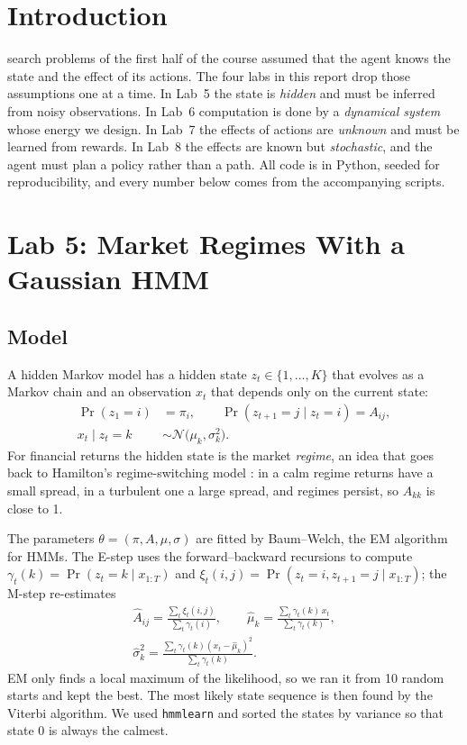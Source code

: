\documentclass[journal]{IEEEtran}
\newcommand{\st}[1]{\texttt{#1}}
\begin{document}
\section{Introduction}
 search problems of the first half of the course assumed that the agent
knows the state and the effect of its actions. The four labs in this report drop those
assumptions one at a time. In Lab~5 the state is \emph{hidden} and must be inferred from noisy
observations. In Lab~6 computation is done by a \emph{dynamical system} whose energy we design.
In Lab~7 the effects of actions are \emph{unknown} and must be learned from rewards. In Lab~8 the
effects are known but \emph{stochastic}, and the agent must plan a policy rather than a path. All
code is in Python, seeded for reproducibility, and every number below comes from the
accompanying scripts.

\section{Lab 5: Market Regimes With a Gaussian HMM}
\subsection{Model}
A hidden Markov model \cite{rabiner1989} has a hidden state $z_t\in\{1,\dots,K\}$ that evolves
as a Markov chain and an observation $x_t$ that depends only on the current state:
\begin{align}
\Pr(z_1=i) &= \pi_i, \qquad \Pr(z_{t+1}=j\mid z_t=i) = A_{ij},\\
x_t \mid z_t = k &\sim \mathcal{N}\bigl(\mu_k,\sigma_k^2\bigr).
\end{align}
For financial returns the hidden state is the market \emph{regime}, an idea that goes back to
Hamilton's regime-switching model \cite{hamilton1989}: in a calm regime returns have a small
spread, in a turbulent one a large spread, and regimes persist, so $A_{kk}$ is close to 1.

The parameters $\theta = (\pi, A, \mu, \sigma)$ are fitted by Baum--Welch, the EM algorithm
for HMMs. The E-step uses the forward--backward recursions to compute
$\gamma_t(k) = \Pr(z_t=k\mid x_{1:T})$ and
$\xi_t(i,j)=\Pr(z_t=i, z_{t+1}=j\mid x_{1:T})$; the M-step re-estimates
\begin{gather}
\hat A_{ij} = \frac{\sum_t \xi_t(i,j)}{\sum_t \gamma_t(i)},\qquad
\hat\mu_k = \frac{\sum_t \gamma_t(k)\,x_t}{\sum_t\gamma_t(k)},\\
\hat\sigma_k^2 = \frac{\sum_t \gamma_t(k)(x_t-\hat\mu_k)^2}{\sum_t\gamma_t(k)} .
\end{gather}
EM only finds a local maximum of the likelihood, so we ran it from 10 random starts and kept
the best. The most likely state sequence is then found by the Viterbi algorithm. We used
\st{hmmlearn} \cite{hmmlearn} and sorted the states by variance so that state 0 is always the
calmest.
\end{document}
